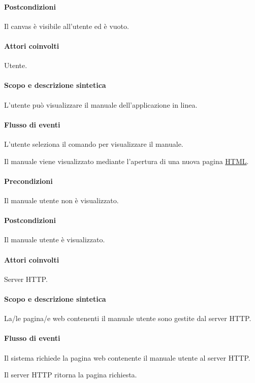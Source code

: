 \paragraph{Postcondizioni} Il canvas \`e visibile all'utente ed \`e vuoto.

\paragraph{Attori coinvolti} Utente.
\paragraph{Scopo e descrizione sintetica}
L'utente pu\`o visualizzare il manuale dell'applicazione in linea.
\paragraph{Flusso di eventi}
\begin{elenconumerato}[\textbf{}]{\subsubsecindent}
\item L'utente seleziona il comando per visualizzare il manuale. 
\item Il manuale viene visualizzato mediante l'apertura di una nuova pagina {\underline{HTML}}.
\end{elenconumerato}
\paragraph{Precondizioni} Il manuale utente non \`e visualizzato.
\paragraph{Postcondizioni} Il manuale utente \`e visualizzato.

\paragraph{Attori coinvolti} Server HTTP.
\paragraph{Scopo e descrizione sintetica}
La/le pagina/e web contenenti il manuale utente sono gestite dal server HTTP.
\paragraph{Flusso di eventi}
\begin{elenconumerato}[\textbf{}]{\subsubsecindent}
\item Il sistema richiede la pagina web contenente il manuale utente al server HTTP.
\item Il server HTTP ritorna la pagina richiesta.
\end{elenconumerato}
